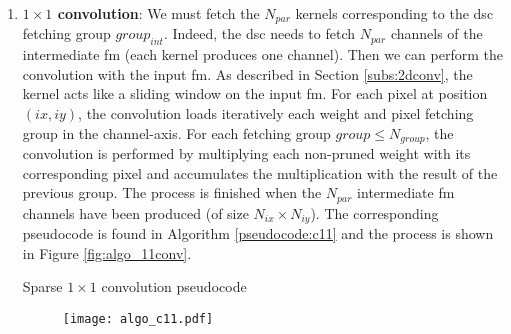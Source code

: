 \begin{enumerate}
    \item \textbf{$1 \times 1$ convolution}: We must fetch the $N_{par}$ kernels corresponding to the \acrshort{dsc} fetching group $group_{int}$. Indeed, the \acrshort{dsc} needs to fetch $N_{par}$ channels of the intermediate \acrshort{fm} (each kernel produces one channel). Then we can perform the convolution with the input \acrshort{fm}. As described in Section \ref{subs:2dconv}, the kernel acts like a sliding window on the input \acrshort{fm}. For each pixel at position $(ix, iy)$, the convolution loads iteratively each weight and pixel fetching group in the channel-axis. For each fetching group $group \leq N_{group}$, the convolution is performed by multiplying each non-pruned weight with its corresponding pixel and accumulates the multiplication with the result of the previous group. The process is finished when the $N_{par}$ intermediate \acrshort{fm} channels have been produced (of size $N_{ix} \times N_{iy}$). The corresponding pseudocode is found in Algorithm \ref{pseudocode:c11} and the process is shown in Figure \ref{fig:algo_11conv}.
    \begin{algorithm}[H]
        \centering
        \begin{algorithmic}
             
                 
                     
                         
                             
                            \EndFor
                        \EndFor
                    \EndFor
                \EndFor
            \EndFor
        \end{algorithmic}
        \caption{Sparse $1 \times 1$ convolution pseudocode}
        \label{pseudocode:c11}
    \end{algorithm}
    \begin{figure}[H]
        \centering
        \texttt{[image: algo\_c11.pdf]}

\end{figure}
\end{enumerate}
